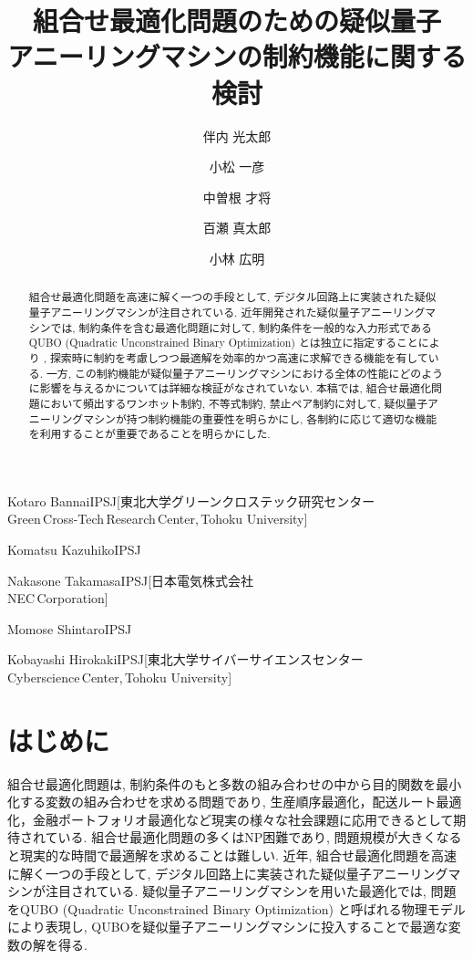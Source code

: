 \documentclass[submit,techrep,noauthor]{ipsj}
\begin{document}
\title{組合せ最適化問題のための疑似量子\\アニーリングマシンの制約機能に関する検討}

\author{伴内 光太郎}{Kotaro Bannai}{IPSJ}[東北大学グリーンクロステック研究センター\\Green\,Cross-Tech\,Research\,Center{,}\,Tohoku University]
\author{小松 一彦}{Komatsu Kazuhiko}{IPSJ}
\author{中曽根 才将}{Nakasone Takamasa}{IPSJ}[日本電気株式会社\\NEC\,Corporation]
\author{百瀬 真太郎}{Momose Shintaro}{IPSJ}
\author{小林 広明}{Kobayashi Hirokaki}{IPSJ}[東北大学サイバーサイエンスセンター\\Cyberscience\,Center{,}\,Tohoku University]

\begin{abstract}
組合せ最適化問題を高速に解く一つの手段として, デジタル回路上に実装された疑似量子アニーリングマシンが注目されている. 近年開発された疑似量子アニーリングマシンでは, 制約条件を含む最適化問題に対して, 制約条件を一般的な入力形式であるQUBO (Quadratic Unconstrained Binary Optimization) とは独立に指定することにより
, 探索時に制約を考慮しつつ最適解を効率的かつ高速に求解できる機能を有している. 一方, この制約機能が疑似量子アニーリングマシンにおける全体の性能にどのように影響を与えるかについては詳細な検証がなされていない. 本稿では, 組合せ最適化問題において頻出するワンホット制約, 不等式制約, 禁止ペア制約に対して, 疑似量子アニーリングマシンが持つ制約機能の重要性を明らかにし, 各制約に応じて適切な機能を利用することが重要であることを明らかにした.
\end{abstract}

\maketitle

\section{はじめに}
組合せ最適化問題は, 制約条件のもと多数の組み合わせの中から目的関数を最小化する変数の組み合わせを求める問題であり, 生産順序最適化\cite{jobshop}，配送ルート最適化\cite{isc-onoda}，金融ポートフォリオ最適化\cite{portfolio}など現実の様々な社会課題に応用できるとして期待されている. 組合せ最適化問題の多くはNP困難であり, 問題規模が大きくなると現実的な時間で最適解を求めることは難しい. 近年, 組合せ最適化問題を高速に解く一つの手段として, デジタル回路上に実装された疑似量子アニーリングマシンが注目されている. 疑似量子アニーリングマシンを用いた最適化では, 問題をQUBO (Quadratic Unconstrained Binary Optimization) と呼ばれる物理モデルにより表現し, QUBOを疑似量子アニーリングマシンに投入することで最適な変数の解を得る.
\end{document}
